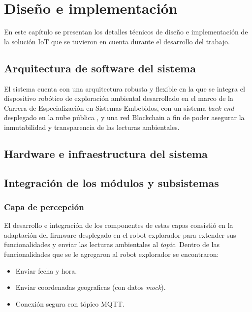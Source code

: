 \chapter{Diseño e implementación} %

\label{Chapter3} %

En este capítulo se presentan los detalles técnicos de diseño e implementación de la solución IoT que se tuvieron en cuenta durante el desarrollo del trabajo.


\section{Arquitectura de software del sistema}


El sistema cuenta con una arquitectura robusta y flexible en la que se integra el dispositivo robótico de exploración ambiental \citep{cese_gonzalo_memoria} desarrollado en el marco de la Carrera de Especialización en Sistemas Embebidos, con un sistema \textit{back-end} desplegado en la nube pública \citep{nube_publica}, y una red Blockchain \cite{blockchain} a fin de poder asegurar la inmutabilidad y transparencia de las lecturas ambientales. 


\section{Hardware e infraestructura del sistema}
 
 
\section{Integración de los módulos y subsistemas}




\subsection{Capa de percepción}


El desarrollo e integración de los componentes de estas capas consistió en la adaptación del firmware desplegado en el robot explorador para extender sus funcionalidades y enviar las lecturas ambientales al \textit{topic}. Dentro de las funcionalidades que se le agregaron al robot explorador se encontraron:

\begin{itemize}
	\item Enviar fecha y hora.
	\item Enviar coordenadas geograficas (con datos \textit{mock}).
	\item Conexión segura con tópico MQTT.	
		
\end{itemize}

